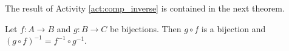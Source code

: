 \begin{comment}

\ActivitySolution

\ba
\item Theorem~\ref{thm:compositefunctions} tells us that $g \circ f: A \to C$  is a bijection, and hence invertible. Note that $( {g \circ f} )^{ - 1} : C \to A$.  

\item To prove that $ ({g \circ f} )^{ - 1} =  ( {f^{ - 1}  \circ g^{ - 1} } )$, we need to show that 
\[( {g \circ f} )^{ - 1} ( c ) = ( {f^{ - 1}  \circ g^{ - 1} } )( c )\]
for every $c \in C$. 

\item Suppose $c \in C$. 
	\begin{enumerate}[i.]
	\item Let $c \in C$. Since the function  $g$  is a surjection, there exists a  $b \in B$ such that $g(b) = c$. 
	
	\item Since  $f$  is a surjection, there exists an  $a \in A$  such that $f(a) = b$. 

	\item We then have $(g \circ f)(a) = g(f(a)) = g(b) = c$, so $a = (g \circ f)^{-1}(c)$. 
	
	\item By definition, $f^{-1}(b) = a$ and $g^{-1}(c) = b$. 
	
	\item It follows that  
	\[\left(f^{-1} \circ g^{-1}\right)(c) = f^{-1}\left(g^{-1}(c)\right) = f^{-1}(b) = a.\]
	
	\item Since 
	\[ (g \circ f)^{-1}(c)  = a = \left(f^{-1} \circ g^{-1}\right)(c),\]
	we conclude that $(g \circ f)^{-1}(c)  =  \left(f^{-1} \circ g^{-1}\right)(c)$ for every $c \in C$. Consequently, $(g \circ f)^{-1}  =  f^{-1} \circ g^{-1}$. 

	\end{enumerate}
\ea

\end{comment}

The result of Activity \ref{act:comp_inverse} is contained in the next theorem.

\begin{theorem} \label{compositionofbijections}
Let $f: A \to B$  and  $g: B \to C$  be bijections.  Then  $g \circ f$  is a bijection and  
$( {g \circ f} )^{ - 1}  = f^{ - 1}  \circ g^{ - 1} $.
\end{theorem}

